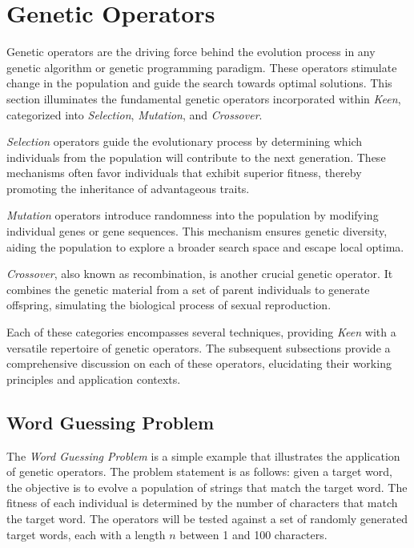 
\section{Genetic Operators}
\label{sec:keen:operators}
  Genetic operators are the driving force behind the evolution process in any
  genetic algorithm or genetic programming paradigm.
  These operators stimulate change in the population and guide the search
  towards optimal solutions.
  This section illuminates the fundamental genetic operators incorporated within
  \textit{Keen}, categorized into \textit{Selection}, \textit{Mutation}, and
  \textit{Crossover}.

  \textit{Selection} operators guide the evolutionary process by determining
  which individuals from the population will contribute to the next generation.
  These mechanisms often favor individuals that exhibit superior fitness, 
  thereby promoting the inheritance of advantageous traits.

  \textit{Mutation} operators introduce randomness into the population by 
  modifying individual genes or gene sequences.
  This mechanism ensures genetic diversity, aiding the population to explore a 
  broader search space and escape local optima.

  \textit{Crossover}, also known as recombination, is another crucial genetic 
  operator.
  It combines the genetic material from a set of parent individuals to generate
  offspring, simulating the biological process of sexual reproduction.

  Each of these categories encompasses several techniques, providing
  \textit{Keen} with a versatile repertoire of genetic operators.
  The subsequent subsections provide a comprehensive discussion on each of these
  operators, elucidating their working principles and application contexts.

  \subsection{Word Guessing Problem}
  \label{sec:keen:operators:word_guessing}
    The \emph{Word Guessing Problem} is a simple example that illustrates the
    application of genetic operators.
    The problem statement is as follows: given a target word, the objective is
    to evolve a population of strings that match the target word.
    The fitness of each individual is determined by the number of characters
    that match the target word.
    The operators will be tested against a set of randomly generated target
    words, each with a length \(n\) between 1 and 100 characters.

